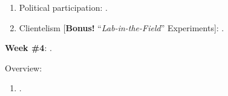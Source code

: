 \documentclass[letterpaper]{article}
\renewenvironment{itemize}{
  \begin{list}{}{
    \setlength{\leftmargin}{1.5em}
  }
}{
  \end{list}
}
\begin{document}
\begin{enumerate}
\begin{itemize}
\begin{enumerate}
          \item[$\bullet$] Political participation: \href{https://onlinelibrary.wiley.com/doi/pdf/10.1111/j.1540-5907.2008.00332.x}{}.


          \item[$\bullet$] Clientelism [{\bf Bonus!} ``\emph{Lab-in-the-Field}'' Experiments]: \href{https://doi.org/10.1177/0010414017695336}{}.


         \end{enumerate}

      \end{itemize}


  \item {\bf Week \#4}:  {\color{ForestGreen}{\bf Natural Experiments}}.


      \begin{itemize} 

        \item[$\diamond$] Overview:

        \begin{enumerate}



          \item[$\bullet$] \href{https://doi.org/10.1017/CBO9781139084444}{}. %



\end{enumerate}
\end{itemize}
\end{enumerate}
\end{document}

